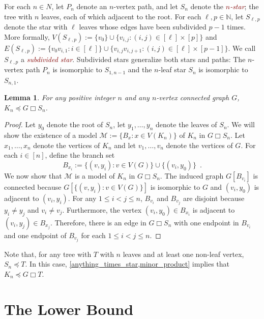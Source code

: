 \documentclass[lotsofwhite]{patmorin}
\newcommand{\defn}[1]{\textcolor{Maroon}{\emph{#1}}}
\newcommand{\boxprod}{\mathbin{\Box}}
\newcommand{\N}{\mathbb{N}}
\renewcommand{\le}{\leqslant}
\DeclareMathOperator{\gm}{gm}
\theoremstyle{plain}
\newtheorem{lem}[thm]{Lemma}
\theoremstyle{definition}
\begin{document}
For each $n\in N$, let $P_n$ denote an $n$-vertex path, and let $S_n$ denote the \defn{$n$-star}; the tree with $n$ leaves, each of which adjacent to the root.  For each $\ell,p\in\N$, let $S_{\ell,p}$ denote the star with $\ell$ leaves whose edges have been subdivided $p-1$ times.  More formally, $V(S_{\ell,p}):=\{v_0\}\cup\{v_{i,j}:(i,j)\in[\ell]\times[p]\}$ and $E(S_{\ell,p}):=\{v_0v_{i,1}:i\in[\ell]\}\cup \{v_{i,j}v_{i,j+1}:(i,j)\in[\ell]\times[p-1]\}$.  We call $S_{\ell,p}$ a \defn{subdivided star}.  Subdivided stars generalize both stars and paths: The $n$-vertex path $P_n$ is isomorphic to $S_{1,n-1}$ and the $n$-leaf star $S_n$ is isomorphic to $S_{n,1}$.

\begin{lem}\label{anything_times_star}
  For any positive integer $n$ and any $n$-vertex connected graph $G$, $K_{n} \preceq G\boxprod S_n$.
\end{lem}

\begin{proof}
  Let $y_0$ denote the root of $S_n$, let $y_1,\ldots,y_n$ denote the leaves of $S_n$.  We will show the existence of a model $\mathcal{M}:=\{B_x:x\in V(K_n)\}$ of $K_n$ in $G\boxprod S_n$.  Let $x_1,\ldots,x_{n}$ denote the vertices of $K_{n}$ and let $v_1,\ldots,v_n$ denote the vertices of $G$.  For each $i\in[n]$, define the branch set
  \[
     B_{x_i}:=\{(v,y_i):v\in V(G)\} \cup \{ (v_{i},y_0) \} \enspace .
  \]
  We now show that $\mathcal{M}$ is a model of $K_n$ in $G\boxprod S_n$.
  The induced graph $G[B_{v_i}]$ is connected because $G[\{(v,y_i):v\in V(G)\}]$ is isomorphic to $G$ and $(v_{i},y_0)$ is adjacent to $(v_{i},y_i)$.
  For any $1\le i< j\le n$, $B_{v_i}$ and $B_{v_j}$ are disjoint because $y_i\neq y_j$ and $v_i\neq v_j$.  Furthermore, the vertex $(v_{i},y_0)\in B_{x_i}$ is adjacent to $(v_i,y_j)\in B_{x_j}$.  Therefore, there is an edge in $G\boxprod S_n$ with one endpoint in $B_{v_i}$ and one endpoint of $B_{v_j}$ for each $1\le i < j\le n$.
\end{proof}

Note that, for any tree with $T$ with $n$ leaves and at least one non-leaf vertex, $S_n\preceq T$.  In this case, \cref{anything_times_star,minor_product} implies that $K_n\preceq G\boxprod T$.

\section{The Lower Bound}

\end{document}
